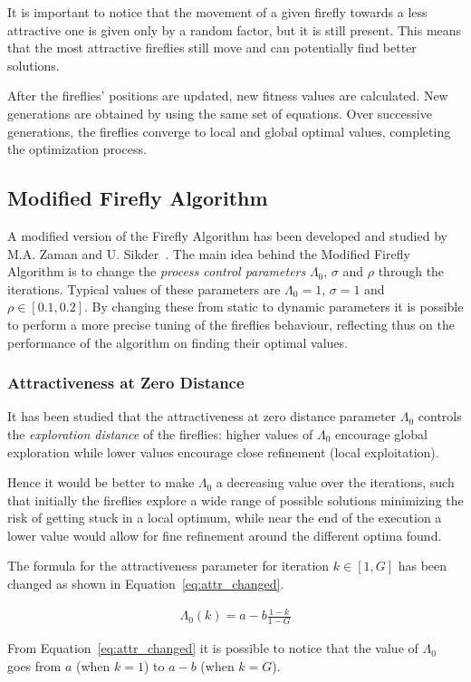 It is important to notice that the movement of a given firefly
towards a less attractive one is given only by a random factor, but it is still present.
This means that the most attractive fireflies still move and can
potentially find better solutions.

After the fireflies' positions are updated, new fitness values
are calculated. New generations are obtained
by using the same set of equations. Over successive generations,
the fireflies converge to local and global optimal values,
completing the optimization process.

\clearpage

\subsection{Modified Firefly Algorithm}

A modified version of the Firefly Algorithm has been developed and studied
by M.A. Zaman and U. Sikder~\cite{zaman2015bouc}. The main idea behind
the Modified Firefly Algorithm is to change the \textit{process control parameters}
$\Lambda_0$, $\sigma$ and $\rho$ through the iterations. Typical values
of these parameters are $\Lambda_0=1$, $\sigma = 1$ and $\rho \in \left[0.1,0.2\right]$.
By changing these from static to dynamic parameters it is possible to perform
a more precise tuning of the fireflies behaviour, reflecting thus on the performance
of the algorithm on finding their optimal values.

\subsubsection{Attractiveness at Zero Distance}

It has been studied that the attractiveness at zero distance parameter $\Lambda_0$
controls the \textit{exploration distance} of the fireflies: 
higher values of $\Lambda_0$ encourage global exploration while
lower values encourage close refinement (local exploitation). 

Hence it would be better to make $\Lambda_0$ a decreasing value over the iterations, 
such that initially the fireflies explore a wide range of possible solutions
minimizing the risk of getting stuck in a local optimum, while 
near the end of the execution a lower value would allow for fine refinement
around the different optima found.

The formula for the attractiveness parameter for iteration
$k\in \left[1,G\right]$ has been changed as shown in Equation~\ref{eq:attr_changed}.

\begin{align}
\label{eq:attr_changed}
\Lambda_0(k) = a - b\frac{1-k}{1-G}
\end{align}

From Equation~\ref{eq:attr_changed} it is possible to notice
that the value of $\Lambda_0$ goes from $a$ (when $k=1$) to $a-b$ (when $k=G$).










